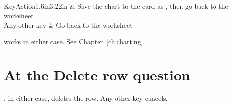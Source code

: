 \begin{cctable}{Key}{Action}{1.6in}{3.22in}
 & Save the chart to the card as , then go back to the
worksheet \\
Any other key & Go back to the worksheet \\
\end{cctable}

 works in either case. See Chapter~\ref{ch:charting}.

\section{At the Delete row question}

, in either case, deletes the row. Any other key cancels.
